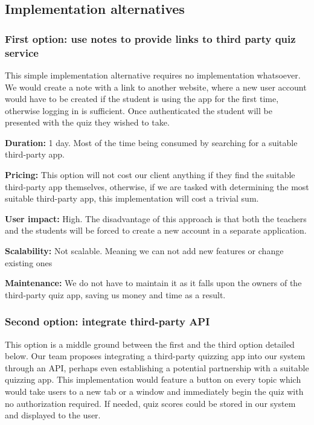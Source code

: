 \documentclass[
    english, %
]{VUMIFPSkursinis}
\begin{document}
\subsection{Implementation alternatives}

\subsubsection{First option: use notes to provide links to third party quiz service}

This simple implementation alternative requires no implementation whatsoever.  We would create a note with a link to another website, where a new user account would have to be created if the student is using the app for the first time, otherwise logging in is sufficient. Once authenticated the student will be presented with the quiz they wished to take.

\textbf{Duration:} 1 day. Most of the time being consumed by searching for a suitable third-party app.

\textbf{Pricing:} This option will not cost our client anything if they find the suitable third-party app themselves, otherwise, if we are tasked with determining the most suitable third-party app, this implementation will cost a trivial sum.

\textbf{User impact:} High. The disadvantage of this approach is that both the teachers and the students will be forced to create a new account in a separate application.

\textbf{Scalability:} Not scalable. Meaning we can not add new features or change existing ones

\textbf{Maintenance:} We do not have to maintain it as it falls upon the owners of the third-party quiz app, saving us money and time as a result.

\subsubsection{Second option: integrate third-party API}

This option is a middle ground between the first and the third option detailed below. Our team proposes integrating a third-party quizzing app into our system through an API, perhaps even establishing a potential partnership with a suitable quizzing app. This implementation would feature a button on every topic which would take users to a new tab or a window and immediately begin the quiz with no authorization required. If needed, quiz scores could be stored in our system and displayed to the user.
\end{document}
